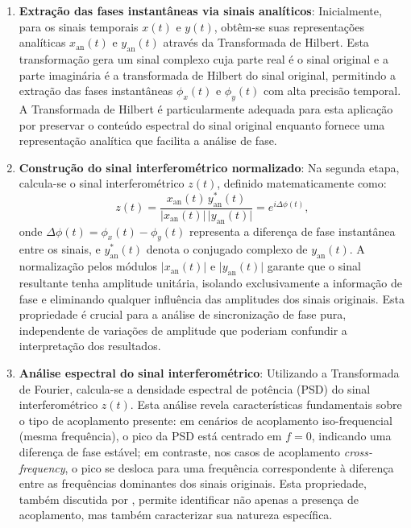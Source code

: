\begin{enumerate}
    \item \textbf{Extração das fases instantâneas via sinais analíticos}: Inicialmente, para os sinais temporais \(x(t)\) e \(y(t)\), obtêm-se suas representações analíticas \(x_{\mathrm{an}}(t)\) e \(y_{\mathrm{an}}(t)\) através da Transformada de Hilbert. Esta transformação gera um sinal complexo cuja parte real é o sinal original e a parte imaginária é a transformada de Hilbert do sinal original, permitindo a extração das fases instantâneas \(\phi_x(t)\) e \(\phi_y(t)\) com alta precisão temporal. A Transformada de Hilbert é particularmente adequada para esta aplicação por preservar o conteúdo espectral do sinal original enquanto fornece uma representação analítica que facilita a análise de fase.

    \item \textbf{Construção do sinal interferométrico normalizado}: Na segunda etapa, calcula-se o sinal interferométrico \(z(t)\), definido matematicamente como:
    \[
    z(t) = \frac{x_{\mathrm{an}}(t)\, y_{\mathrm{an}}^*(t)}{\lvert x_{\mathrm{an}}(t)\rvert\, \lvert y_{\mathrm{an}}(t)\rvert} = e^{i\Delta \phi(t)},
    \]
    onde \(\Delta \phi(t) = \phi_x(t) - \phi_y(t)\) representa a diferença de fase instantânea entre os sinais, e \(y_{\mathrm{an}}^*(t)\) denota o conjugado complexo de \(y_{\mathrm{an}}(t)\). A normalização pelos módulos \(\lvert x_{\mathrm{an}}(t)\rvert\) e \(\lvert y_{\mathrm{an}}(t)\rvert\) garante que o sinal resultante tenha amplitude unitária, isolando exclusivamente a informação de fase e eliminando qualquer influência das amplitudes dos sinais originais. Esta propriedade é crucial para a análise de sincronização de fase pura, independente de variações de amplitude que poderiam confundir a interpretação dos resultados.

    \item \textbf{Análise espectral do sinal interferométrico}: Utilizando a Transformada de Fourier, calcula-se a densidade espectral de potência (PSD) do sinal interferométrico \(z(t)\). Esta análise revela características fundamentais sobre o tipo de acoplamento presente: em cenários de acoplamento iso-frequencial (mesma frequência), o pico da PSD está centrado em \(f = 0\), indicando uma diferença de fase estável; em contraste, nos casos de acoplamento \textit{cross-frequency}, o pico se desloca para uma frequência correspondente à diferença entre as frequências dominantes dos sinais originais. Esta propriedade, também discutida por , permite identificar não apenas a presença de acoplamento, mas também caracterizar sua natureza específica.


\end{enumerate}
